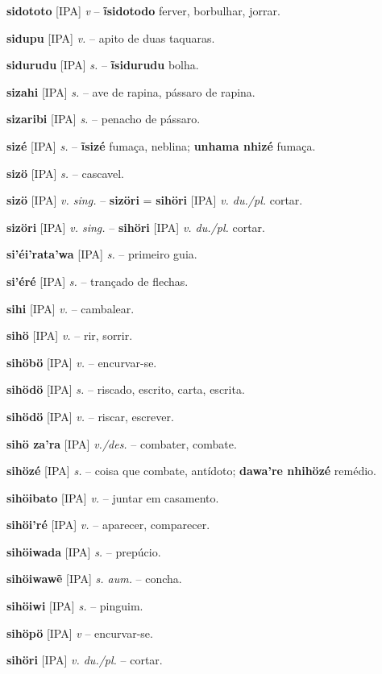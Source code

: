\textbf{sidototo} [IPA] \textit{v} -- \textbf{ĩsidotodo} ferver, borbulhar, jorrar.

\textbf{sidupu} [IPA] \textit{v.} -- apito de duas taquaras.

\textbf{sidurudu} [IPA] \textit{s.} -- \textbf{ĩsidurudu} bolha.

\textbf{sizahi} [IPA] \textit{s.} -- ave de rapina, pássaro de rapina.

\textbf{sizaribi} [IPA] \textit{s.} -- penacho de pássaro.

\textbf{sizé} [IPA] \textit{s.} -- \textbf{ĩsizé} fumaça, neblina; \textbf{unhama nhizé} fumaça.

\textbf{sizö} [IPA] \textit{s.} -- cascavel.

\textbf{sizö} [IPA] \textit{v. sing.} -- \textbf{sizöri} = \textbf{sihöri} [IPA] \textit{v. du./pl.} cortar.

\textbf{sizöri} [IPA] \textit{v. sing.} -- \textbf{sihöri} [IPA] \textit{v. du./pl.} cortar.

\textbf{si'éi'rata'wa} [IPA] \textit{s.} -- primeiro guia.

\textbf{si'éré} [IPA] \textit{s.} -- trançado de flechas.

\textbf{sihi} [IPA] \textit{v.} -- cambalear.

\textbf{sihö} [IPA] \textit{v.} -- rir, sorrir.

\textbf{sihöbö} [IPA] \textit{v.} -- encurvar-se.

\textbf{sihödö} [IPA] \textit{s.} -- riscado, escrito, carta, escrita.

\textbf{sihödö} [IPA] \textit{v.} -- riscar, escrever.

\textbf{sihö za'ra} [IPA] \textit{v./des.} -- combater, combate.

\textbf{sihözé} [IPA] \textit{s.} -- coisa que combate, antídoto; \textbf{dawa're nhihözé} remédio.

\textbf{sihöibato} [IPA] \textit{v.} -- juntar em casamento.

\textbf{sihöi'ré} [IPA] \textit{v.} -- aparecer, comparecer.

\textbf{sihöiwada} [IPA] \textit{s.} -- prepúcio.

\textbf{sihöiwawẽ} [IPA] \textit{s. aum.} -- concha.

\textbf{sihöiwi} [IPA] \textit{s.} -- pinguim.

\textbf{sihöpö} [IPA] \textit{v} -- encurvar-se.

\textbf{sihöri} [IPA] \textit{v. du./pl.} -- cortar.

